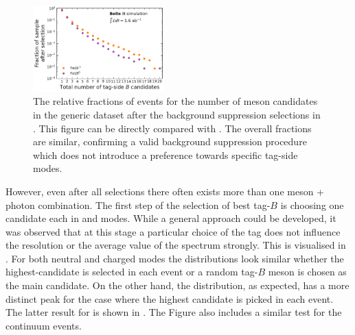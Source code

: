 \begin{figure}[hbtp!]
    \centering
    \includegraphics[width=0.45\textwidth]{figures/best_tag_selection/Bboth_total_tag_candidates_post_optimisation.pdf}
    \caption{\label{fig:fei_tag_reco_candidates_post_optimisation} 
    The relative fractions of events for the number of \B meson candidates in the generic \MC dataset after the background suppression selections in .
    This figure can be directly compared with .
    The overall fractions are similar, confirming a valid background suppression procedure which does not introduce a preference towards specific tag-side modes.
    }
\end{figure}

However, even after all selections there often exists more than one \B meson + photon combination.
The first step of the selection of best tag-$B$ is choosing one candidate each in \feiBp and \feiBz modes.
While a general approach could be developed, it was observed that at this stage a particular choice of the tag does not influence the resolution or the average value of the spectrum strongly.
This is visualised in .
For both neutral and charged \BtoXsgamma modes the distributions look similar whether the highest-\feiProb candidate is selected in each event or a random tag-$B$ meson is chosen as the main candidate.
On the other hand, the \Mbc distribution, as expected, has a more distinct peak for the case where the highest \feiProb candidate is picked in each event.
The latter result for \BtoXsgamma is shown in .
The Figure also includes a similar \Mbc test for the continuum events.


